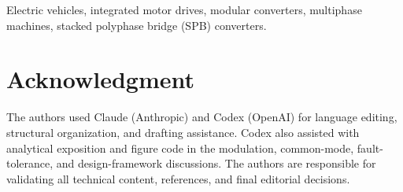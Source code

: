 \documentclass[journal]{IEEEtran}
\begin{document}
\begin{IEEEkeywords}
Electric vehicles, integrated motor drives, modular converters,
multiphase machines, stacked polyphase bridge (SPB) converters.
\end{IEEEkeywords}













\section*{Acknowledgment}
The authors used Claude (Anthropic) and Codex (OpenAI) for language
editing, structural organization, and drafting assistance. Codex also
assisted with analytical exposition and figure code in the modulation,
common-mode, fault-tolerance, and design-framework discussions. The
authors are responsible for validating all technical content, references,
and final editorial decisions.



\end{document}
